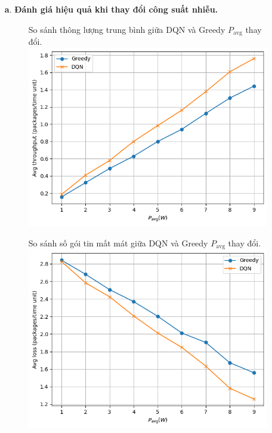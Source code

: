 \documentclass{uetgraduation}
\begin{document}
\begin{enumerate}
    \item[\textbf{a}.] \textbf{Đánh giá hiệu quả khi thay đổi công suất nhiễu.}
    \begin{figure}{So sánh thông lượng trung bình giữa DQN và Greedy $P_\text{avg}$ thay đổi.}
        \centering
        \includegraphics[scale=0.5]{p_avg_throughput}
        \label{fig:p_avg_throughput}
    \end{figure}
    \begin{figure}{So sánh số gói tin mất mát giữa DQN và Greedy $P_\text{avg}$ thay đổi.}
        \centering
        \includegraphics[scale=0.5]{p_avg_loss}
        \label{fig:p_avg_loss}
    \end{figure}

\end{enumerate}
\end{document}
